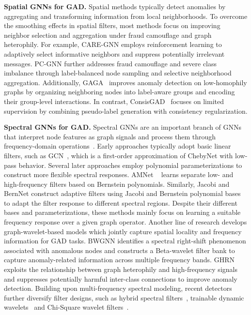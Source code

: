 \noindent \textbf{Spatial GNNs for GAD.}
Spatial methods typically detect anomalies by aggregating and transforming information from local neighborhoods. 
To overcome the smoothing effects in spatial filters, most methods focus on improving neighbor selection and
aggregation under fraud camouflage and graph heterophily. 
For example, CARE-GNN \citep{CARE-GNN} employs reinforcement learning to adaptively select informative neighbors and suppress potentially irrelevant messages. 
PC-GNN \citep{PCGNN} further addresses fraud camouflage and severe class imbalance through label-balanced node sampling and selective neighborhood aggregation. 
Additionally, GAGA~\citep{GAGA} improves anomaly detection on low-homophily graphs by organizing neighboring nodes into label-aware groups and encoding their group-level interactions. 
In contrast,  ConsisGAD~\citep{ConsisGAD} focuses on limited supervision by combining pseudo-label generation with consistency regularization.

\noindent \textbf{Spectral GNNs for GAD.}
Spectral GNNs are an important branch of GNNs that interpret node features as graph signals and process them through frequency-domain operations~\citep{xu2020graph}.
Early approaches typically adopt basic linear filters, such as GCN~\citep{GCN}, which is a first-order approximation of ChebyNet with low-pass behavior.
Several later approaches employ polynomial parameterizations to construct more flexible spectral responses. 
AMNet ~\citep{AMNet} learns separate low- and high-frequency filters based on Bernstein polynomials. Similarly, Jacobi \citep{JacobiConv} and BernNet \citep{BernNet} construct adaptive filters using Jacobi and Bernstein polynomial bases to adapt the filter response to different spectral regions.  
Despite their different bases and parameterizations, these methods mainly focus on learning a suitable frequency response over a given graph operator.
Another line of research develops graph-wavelet-based models which jointly capture spatial locality and frequency information for GAD tasks.
BWGNN \citep{BWGNN} identifies a spectral right-shift phenomenon associated with anomalous nodes and constructs a Beta-wavelet filter bank to capture anomaly-related information across multiple frequency bands.
GHRN~\citep{GHRN} exploits the relationship between graph heterophily and high-frequency signals and suppresses potentially harmful inter-class connections to improve anomaly detection.
Building upon multi-frequency spectral modeling, recent detectors further diversify filter
designs, such as hybrid spectral filters~\citep{SEC-GFD},  trainable dynamic wavelets~\citep{DSGAD} and Chi-Square wavelet filters~\citep{ChiGAD}.

